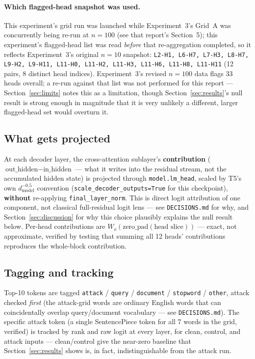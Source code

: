 \documentclass[11pt]{article}
\begin{document}
\paragraph{Which flagged-head snapshot was used.} This experiment's grid run
was launched while Experiment~3's Grid~A was concurrently being re-run at
$n=100$ (see that report's Section~5); this experiment's flagged-head list
was read \emph{before} that re-aggregation completed, so it reflects
Experiment~3's original $n=10$ snapshot: \texttt{L2-H1, L6-H7, L7-H3, L8-H7,
L9-H2, L9-H11, L11-H0, L11-H2, L11-H3, L11-H6, L11-H8, L11-H11} (12 pairs,
8 distinct head indices). Experiment~3's revised $n=100$ data flags 33
heads overall; a re-run against that list was not performed for this
report — Section~\ref{sec:limits} notes this as a limitation, though
Section~\ref{sec:results}'s null result is strong enough in magnitude that
it is very unlikely a different, larger flagged-head set would overturn it.

\subsection{What gets projected}

At each decoder layer, the cross-attention sublayer's \textbf{contribution}
($\text{out\_hidden} - \text{in\_hidden}$ — what it writes into the residual
stream, not the accumulated hidden state) is projected through
\texttt{model.lm\_head}, scaled by T5's own $d_{\text{model}}^{-0.5}$
convention (\texttt{scale\_decoder\_outputs=True} for this checkpoint),
\textbf{without} re-applying \texttt{final\_layer\_norm}. This is direct
logit attribution of one component, not classical full-residual logit
lens — see \texttt{DECISIONS.md} for why, and
Section~\ref{sec:discussion} for why this choice plausibly explains the
null result below. Per-head contributions are $W_o(\text{zero\_pad}(\text{head
slice}))$ — exact, not approximate, verified by testing that summing all
12 heads' contributions reproduces the whole-block contribution.

\subsection{Tagging and tracking}

Top-10 tokens are tagged \texttt{attack} / \texttt{query} / \texttt{document}
/ \texttt{stopword} / \texttt{other}, attack checked \emph{first} (the
attack-grid words are ordinary English words that can coincidentally
overlap query/document vocabulary — see \texttt{DECISIONS.md}). The
specific attack token (a single SentencePiece token for all 7 words in the
grid, verified) is tracked by rank and raw logit at every layer, for
clean, control, and attack inputs — clean/control give the near-zero
baseline that Section~\ref{sec:results} shows is, in fact, indistinguishable
from the attack run.
\end{document}
